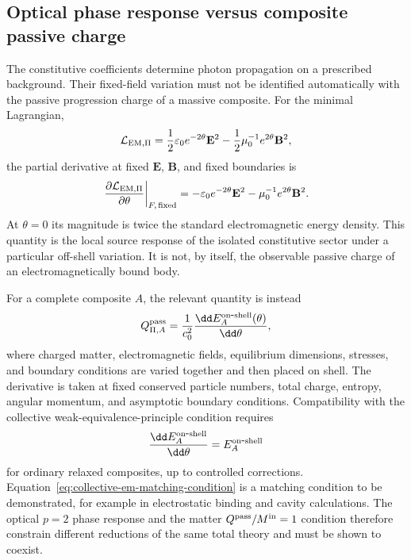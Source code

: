 \documentclass[12pt]{article}
\begin{document}
\subsection{Optical phase response versus composite passive charge}
\label{sec:optical-vs-passive-charge}

The constitutive coefficients determine photon propagation on a prescribed background.  Their fixed-field variation must not be identified automatically with the passive progression charge of a massive composite.  For the minimal Lagrangian,
\begin{equation}
    \mathcal L_{\rm EM,\Pi}
    =\frac12\varepsilon_0e^{-2\theta}\mathbf E^2
    -\frac12\mu_0^{-1}e^{2\theta}\mathbf B^2,
\end{equation}
the partial derivative at fixed \(\mathbf E\), \(\mathbf B\), and fixed boundaries is
\begin{equation}
    \left.\frac{\partial\mathcal L_{\rm EM,\Pi}}{\partial\theta}\right|_{F,\,\rm fixed}
    =-\varepsilon_0e^{-2\theta}\mathbf E^2
     -\mu_0^{-1}e^{2\theta}\mathbf B^2.
    \label{eq:fixed-background-em-response}
\end{equation}
At \(\theta=0\) its magnitude is twice the standard electromagnetic energy density.  This quantity is the local source response of the isolated constitutive sector under a particular off-shell variation.  It is not, by itself, the observable passive charge of an electromagnetically bound body.

For a complete composite \(A\), the relevant quantity is instead
\begin{equation}
    Q_{\Pi,A}^{\rm pass}
    =\frac{1}{c_0^2}
      \frac{\dd E_A^{\rm on\mbox{-}shell}(\theta)}{\dd\theta},
    \label{eq:composite-passive-charge-optics}
\end{equation}
where charged matter, electromagnetic fields, equilibrium dimensions, stresses, and boundary conditions are varied together and then placed on shell.  The derivative is taken at fixed conserved particle numbers, total charge, entropy, angular momentum, and asymptotic boundary conditions.  Compatibility with the collective weak-equivalence-principle condition requires
\begin{equation}
    \frac{\dd E_A^{\rm on\mbox{-}shell}}{\dd\theta}
    =E_A^{\rm on\mbox{-}shell}
    \label{eq:collective-em-matching-condition}
\end{equation}
for ordinary relaxed composites, up to controlled corrections.  Equation~\eqref{eq:collective-em-matching-condition} is a matching condition to be demonstrated, for example in electrostatic binding and cavity calculations.  The optical \(p=2\) phase response and the matter \(Q^{\rm pass}/M^{\rm in}=1\) condition therefore constrain different reductions of the same total theory and must be shown to coexist.
\end{document}
